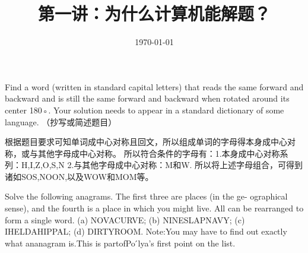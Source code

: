 \documentclass[11pt, a4paper, UTF8]{ctexart}
\title{第一讲：为什么计算机能解题？}
\date{\today}     %
\begin{document}
\maketitle
\noplagiarism	%
\beginthishw	%

\begin{problem}[UD: 1.2]	%
  Find a word (written in standard capital letters) that reads the same forward and backward and is still the same forward and backward when rotated around its center 180◦. Your solution needs to appear in a standard dictionary of some language. （抄写或简述题目）
\end{problem}

\begin{remark}	%
  
\end{remark}

\begin{solution}
  根据题目要求可知单词成中心对称且回文，所以组成单词的字母得本身成中心对称，或与其他字母成中心对称。
  所以符合条件的字母有：1.本身成中心对称系列：H,I,Z,O,S,N    2.与其他字母成中心对称：M和W.
  所以将上述字母组合，可得到诸如SOS,NOON,以及WOW和MOM等。
\end{solution}

\begin{problem}[UD: 1.3]
  Solve the following anagrams. The first three are places (in the ge- ographical sense), and the fourth is a place in which you might live. All can be rearranged to form a single word.
(a) NOVACURVE;
(b) NINESLAPNAVY; (c) IHELDAHIPPAL; (d) DIRTYROOM.
Note:You may have to find out exactly what ananagram is.This is partofPo ́lya’s first point on the list.
\end{problem}
\end{document}

